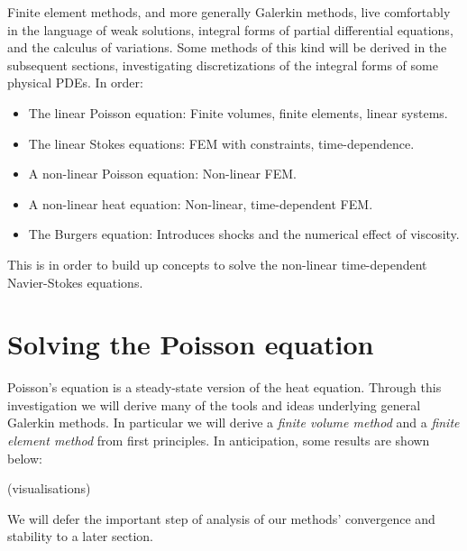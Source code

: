 \documentclass[11pt,a4paper]{memoir}
\begin{document}
Finite element methods, and more generally Galerkin methods, live comfortably in the language of weak solutions, integral forms of partial differential equations,
and the calculus of variations. Some methods of this kind will be derived in the subsequent sections, investigating discretizations of the integral forms
of some physical PDEs. In order:
\begin{itemize}
    \item The linear Poisson equation: Finite volumes, finite elements, linear systems.
    \item The linear Stokes equations: FEM with constraints, time-dependence.
    \item A non-linear Poisson equation: Non-linear FEM.
    \item A non-linear heat equation: Non-linear, time-dependent FEM.
    \item The Burgers equation: Introduces shocks and the numerical effect of viscosity.
\end{itemize}
This is in order to build up concepts to solve the non-linear time-dependent Navier-Stokes equations.

\section{Solving the Poisson equation}
Poisson's equation is a steady-state version of the heat equation.
Through this investigation we will derive many of the tools and ideas underlying general Galerkin methods.
In particular we will derive a \textit{finite volume method} and a \textit{finite element method} from first principles.
In anticipation, some results are shown below:

\vskip 0.2in
(visualisations)
\vskip 0.2in

We will defer the important step of analysis of our methods' convergence and stability to a later section.
\end{document}
